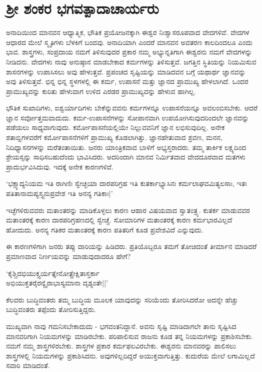 \newpage

\section{ಶ್ರೀ ಶಂಕರ ಭಗವತ್ಪಾದಾಚಾರ್ಯರು}

ಅನಾದಿಯಿಂದ ಮಾನವನ ಆಧ್ಯಾತ್ಮಿಕ, ಭೌತಿಕ ಪ್ರಯೋಜನಕ್ಕಾಗಿ ಈಶ್ವರ ನಿಃಶ್ವಾಸರೂಪವಾದ ವೇದಗಳಿವೆ. ವೇದಗಳ ಆಧಾರದ ಮೇಲೆ ಸ್ಮೃತಿಗಳು ಬೆಳಕಿಗೆ ಬಂದವು. ಅನಾದಿಯಾಗಿ ಎಂದರೆ ಮಾನವನ ಅವತರಣ ಕಾಲದಿಂದಲೂ ಎಂದು ಭಾವ. ಶಾಸ್ತ್ರಗಳು, ಸಂಪ್ರದಾಯ ನಮಗೆ ತಿಳಿಸುವುದರ ಪ್ರಕಾರ ನಮ್ಮ ಅಭ್ಯುನ್ನತಿಗಾಗಿ ಈಶ್ವರನು ನಮಗೆ ವೇದಗಳನ್ನು ನೀಡಿದನು. ವೇದಗಳು ನಾವು ಅನುಷ್ಠಾನ ಮಾಡಬೇಕಾದ ಕರ್ಮಗಳನ್ನು ತಿಳಿಸುತ್ತವೆ. ಜಗತ್ತಿನ ಸ್ಥಿತಿಯನ್ನು ನಿಯಮಿಸುವ ಶಾಸನಗಳನ್ನು ಉಪಾಸಿಸಲು ಅವು ಹೇಳುತ್ತವೆ. ಪ್ರಪಂಚದ ಸೃಷ್ಟಿಯನ್ನು ಮಾಡಿದವನ ಬಗ್ಗೆ ಯಥಾರ್ಥ ಜ್ಞಾನವನ್ನು ಅವು ತಿಳಿಸುತ್ತವೆ. ಭಿನ್ನ ಭಿನ್ನ ಸ್ಥಳಗಳಲ್ಲಿ ಈ ಕರ್ಮ, ಉಪಾಸನೆ ಮತ್ತು ಜ್ಞಾನದ ಪ್ರಾಮುಖ್ಯ ಹೇಳಲಾಗಿದೆ. ಒಂದರ ಪ್ರಾಮುಖ್ಯವನ್ನು ಕುರಿತು ಹೇಳುವಾಗ ಉಳಿದ ಎರಡರ ಪ್ರಾಮುಖ್ಯವನ್ನು ಹೇಳುವ ಹಾಗಿಲ್ಲ.

ಭೌತಿಕ ಸುಖಾದಿಗಳು, ಐಶ್ವರ್ಯಾದಿಗಳು ಬೇಕೆನ್ನುವವನು ಕರ್ಮಗಳನ್ನೂ ಉಪಾಸನೆಯನ್ನೂ ಅವಲಂಬಿಸಬೇಕು. ಆದರೆ ಜ್ಞಾನ ಸರ್ವೋತ್ತಮವಾದುದು. ಕರ್ಮ-ಉಪಾಸನೆಗಳನ್ನು ಸೋಪಾನವಾಗಿ ಉಪಯೋಗಿಸುವುದರಿಂದಲೇ ಜ್ಞಾನವನ್ನು ಪಡೆಯಲು ಸಾಧ್ಯವಾಗುವುದು. ಕರ್ಮೋಪಾಸನೆಯಲ್ಲಿಯೇ ನಿಲ್ಲುವವನಿಗೆ ಜ್ಞಾನ ಲಭಿಸುವುದಿಲ್ಲ. ಅನೇಕ ಶತಾಬ್ದಿಗಳವರೆಗೆ ಕರ್ಮೋಪಾಸನೆಗಳಿಗೆ ಪ್ರಾಮುಖ್ಯ ಕೊಡಲಾಗಿತ್ತು. ಜ್ಞಾನಹೇತುವಾದ ಶ್ರವಣ, ಮನನ, ನಿದಿಧ್ಯಾಸನಗಳನ್ನು ಮರೆತಂತಾಯಿತು. ಜನರು ಯಾಂತ್ರಿಕವಾದ ಬಾಳಿಗೆ ಅಭ್ಯಸ್ತರಾದರು. ತಮ್ಮ ತಾರ್ಕಿಕ ಲಕ್ಷ್ಯದಿಂದ ಶ್ರೇಯಸ್ಸನ್ನು ಸಾಧಿಸಬಹುದೆಂದು ಭಾವಿಸಿದರು. ಅದರಿಂದಾಗಿ ಮಾನವ ನಿರ್ಮಿತವಾದ ವೇದದೂರವಾದ ಮತಗಳು ಪ್ರಾದುರ್ಭವಿಸಿದುವು. ಇದಕ್ಕೆ ಅನೇಕ ಕಾರಣಗಳಿವೆ.

`ಭಕ್ಷ್ಯಾದ್ಯನಿಯಮ ಇತಿ ರಾಗಿಣಿಃ ಸ್ವೇಚ್ಛಯಾ ದಾರಪರಿಗ್ರಹ ಇತಿ ಕುತರ್ಕಾಭ್ಯಾಸಿನಃ ಕರ್ಮಲಾಘವಮಿತ್ಯಲಸಾಃ, ಇತಃ ಪತಿತಾನಾಮಪ್ಯಸ್ತ್ಯನುಪ್ರವೇಶ ಇತಿ ಅನನ್ಯ ಗತಿಕಾಃ|'

ಇಚ್ಛೆಗಳಿರುವವರು ಮತಾಂತರನ್ನು ಮಾಡಿಕೊಳ್ಳಲು ಕಾರಣ ಆಹಾರ ವಿಷಯವಾದ ಸ್ವಾತಂತ್ರ್ಯ. ಕುತರ್ಕ ಮಾಡುವವರ ಮತಾಂತರಕ್ಕೆ ಕಾರಣ ದಾರಪರಿಗ್ರಹಣದಲ್ಲಿ ಸ್ವೇಚ್ಚೆ. ಸೋಮಾರಿಗಳ ಮತಾಂತರಕ್ಕೆ ಕಾರಣ ಕರ್ಮಭಾರವಿಲ್ಲದೆ ಹೋದುದು. ಅನನ್ಯ ಗತಿಕರ ಮತಾಂತರಕ್ಕೆ ಕಾರಣ ಪತಿತರಿಗೆ ಕೂಡ ಪ್ರವೇಶವಿದೆ ಎನ್ನುವುದು.

ಈ ಕಾರಣಗಳಿಗಾಗಿ ಜನರು ತಪ್ಪು ದಾರಿಯನ್ನು ಹಿಡಿದರು. ಪ್ರತಿಯೊಬ್ಬರೂ ತಮಗೆ ತೋಚಿದಂತೆ ತೀರ್ಮಾನ ಮಾಡಿದರೆ ಪ್ರಮಾಣವಾದ ನಿರ್ಣಯವನ್ನು ಮಾಡುವುದಾದರೂ ಹೇಗೆ?

\begin{shloka}
`ಕೈಶ್ಚಿದಭಿಯುಕ್ತ್ಯರ್ಯತ್ನೇನೋತ್ಪ್ರೇಕ್ಷಿತಾಸ್ತರ್ಕಾ\\
ಅಭಿಯುಕ್ತತರೈರನ್ಯೈರಾಭಾಸ್ಯಮಾನಾ ದೃಶ್ಯಂತೇ||'
\end{shloka}

ಕೆಲವರು ಬುದ್ಧಿವಂತರು ತಮ್ಮ ಬುದ್ಧಿಯ ಮೂಲಕ ಯಾವುದನ್ನು ಸರಿಯೆಂದು ತೋರಿಸಿದರೋ ಅದನ್ನೇ ಹೆಚ್ಚು ಬುದ್ಧಿವಂತರು ತಪ್ಪೆಂದು ತೋರಿಸುತ್ತಿದ್ದರು.

ಮುಖ್ಯವಾಗಿ ನಾವು ಗಮನಿಸಬೇಕಾದುದು - ಭಗವಂತನಿದ್ದಾನೆ. ಅವನು ಸೃಷ್ಟಿ ಮಾಡಿದಾಗಲೇ ತಾನು ಸೃಷ್ಟಿಸಿದ ಮಾನವರಿಗಾಗಿ ನಿಯಮಗಳನ್ನು ಮಾಡಿರಬೇಕು. ಪರಿಪಾಲಿಸುವ ರಾಜನು ಕೂಡ ತನ್ನ ನಿಯಮಗಳನ್ನು ಪ್ರಕಾಶಿಸಬೇಕು. ನಮಗೆ ನಮ್ಮ ಶಾಸ್ತ್ರಗಳಿರಬೇಕು. ಶಾಸ್ತ್ರಗಳ ಪ್ರಕಾರ ಕರ್ಮಫಲವಿರಬೇಕು. ಈಶ್ವರನು ಮಾನವರನ್ನು ಪಾಲಿಸಲು ಶಾಸ್ತ್ರಗಳಲ್ಲಿ ನಿಯಮಗಳನ್ನು ಪ್ರಕಾಶಿಸಿದನು. ಅವುಗಳಿಲ್ಲದಿದ್ದರೆ ಅಯುಕ್ತವಾಗುತ್ತಿತ್ತು. ಕುದುರೆಯ ಮೇಲೆ ಲಗಾಮಿಲ್ಲದೆ ಸವಾರಿ ಮಾಡಿದಂತೆ.


